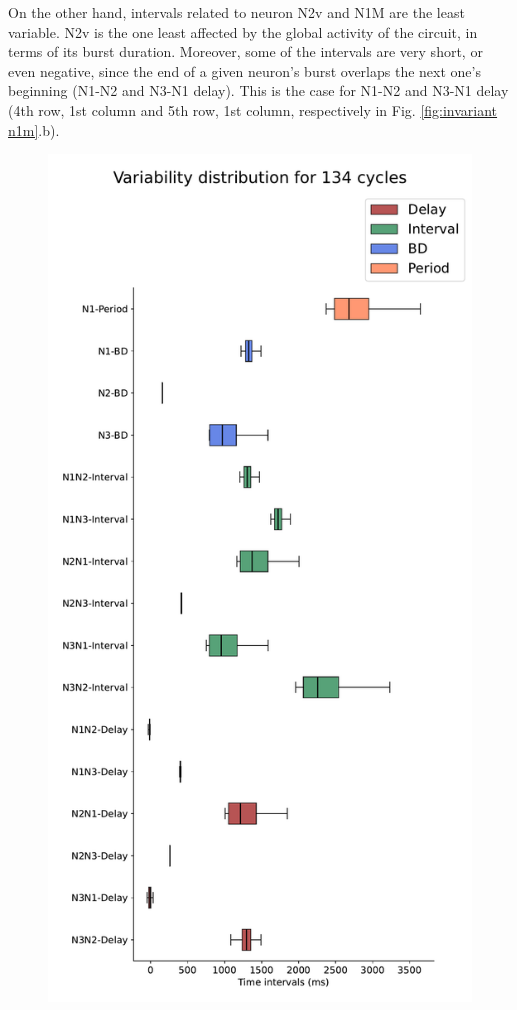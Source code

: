 On the other hand, intervals related to neuron N2v and N1M are the least variable. N2v is the one least affected by the global activity of the circuit, in terms of its burst duration. Moreover, some of the intervals are very short, or even negative, since the end of a given neuron's burst overlaps the next one's beginning (N1-N2 and N3-N1 delay). This is the case for N1-N2 and N3-N1 delay (4th row, 1st column and 5th row, 1st column, respectively in Fig. \ref{fig:invariant n1m}.b).  

\begin{figure}[hbt!]
	\begin{minipage}[b]{0.45\textwidth}
		\centering
		\includegraphics[width=\textwidth]{invariants/data/MODEL/n1m_driven/images/3phases/_boxplot.pdf}

\end{minipage}
\end{figure}
